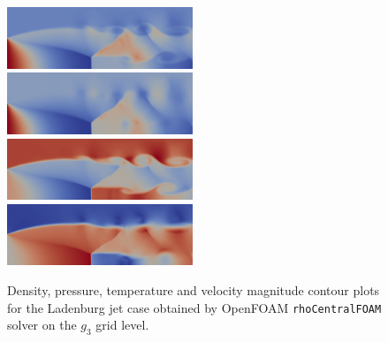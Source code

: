 \documentclass[12pt]{article}
\begin{document}
\begin{figure}[H]
  \centering
  \includegraphics[width=0.495\textwidth]{figs/g3/rho.png}
  \includegraphics[width=0.495\textwidth]{figs/g3/p.png}\\
  \includegraphics[width=0.495\textwidth]{figs/g3/T.png}
  \includegraphics[width=0.495\textwidth]{figs/g3/U.png}
  \caption{Density, pressure, temperature and velocity magnitude contour plots for the Ladenburg jet case obtained by OpenFOAM \texttt{rhoCentralFOAM} solver on the $g_3$ grid level.}
  \label{fig:OFg3plots}
\end{figure}
\end{document}
